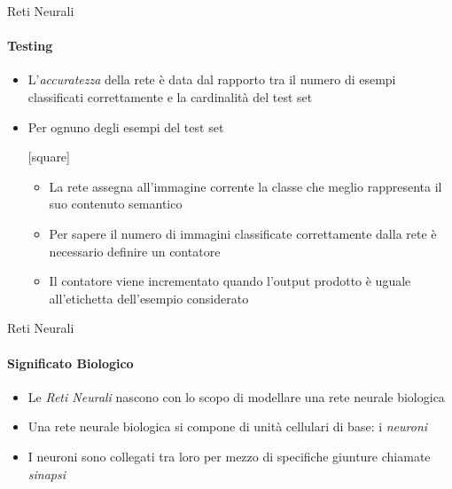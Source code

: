 \documentclass[
 ]{beamer}
\begin{document}
\begin{frame}{Reti Neurali}
    \framesubtitle{Testing}
    \begin{itemize} [<+->]
        \setlength\itemsep{2em}
        \item \large L'\emph{accuratezza} della rete è data dal rapporto tra il numero di esempi classificati correttamente e la cardinalità del test set
        
        \item \large Per ognuno degli esempi del test set
        
        \bigskip
        
        [square] 
        \begin{itemize} 
        \setlength\itemsep{2em}
           \item \large La rete assegna all'immagine corrente la classe che meglio rappresenta il suo contenuto semantico
            \item \large Per sapere il numero di immagini classificate correttamente dalla rete è necessario definire un contatore
            \item \large Il contatore viene incrementato quando l'output prodotto è uguale all'etichetta dell'esempio considerato
        \end{itemize}
    \end{itemize}
\end{frame}

\begin{frame}{Reti Neurali}
    \framesubtitle{Significato Biologico}
    \begin{itemize} [<+->]
        \setlength\itemsep{3em}
        \item \large Le \emph{Reti Neurali} nascono con lo scopo di modellare una rete neurale biologica
       \item \large Una rete neurale biologica si compone di unità cellulari di base: i \emph{neuroni}
       \item \large I neuroni sono collegati tra loro per mezzo di specifiche giunture chiamate \emph{sinapsi}
    \end{itemize}
\end{frame} 
\end{document}
